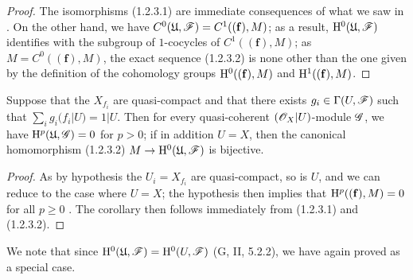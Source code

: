 \begin{proof}
\label{proof-3.1.2.3}
The isomorphisms (1.2.3.1) are immediate consequences of what we saw in .
On the other hand, we have $C^0(\mathfrak{U},\mathscr{F})=C^1((\mathbf{f}),M)$; as a result, $\mathrm{H}^0(\mathfrak{U},\mathscr{F})$ identifies with the subgroup of $1$-cocycles of $C^1((\mathbf{f}),M)$; as $M=C^0((\mathbf{f}),M)$, the exact sequence (1.2.3.2) is none other than the one given by the definition of the cohomology groups $\mathrm{H}^0((\mathbf{f}),M)$ and $\mathrm{H}^1((\mathbf{f}),M)$.
\end{proof}

\begin{cor}[1.2.4]
\label{3.1.2.4}
Suppose that the $X_{f_i}$ are quasi-compact and that there exists $g_i\in\Gamma(U,\mathscr{F})$ such that $\sum_i g_i(f_i|U)=1|U$.
Then for every quasi-coherent $(\mathscr{O}_X|U)$-module $\mathscr{G}$, we have $\mathrm{H}^p(\mathfrak{U},\mathscr{G})=0$ for $p>0$; if in addition $U=X$, then the canonical homomorphism (1.2.3.2) $M\to\HH^0(\fk{U},\sh{F})$ is bijective.
\end{cor}

\begin{proof}
\label{proof-3.1.2.4}
As by hypothesis the $U_i=X_{f_i}$ are quasi-compact, so is $U$, and we can reduce to the case where $U=X$; the hypothesis then implies that $\mathrm{H}^p((\mathbf{f}),M)=0$ for all $p\geq 0$ .
The corollary then follows immediately from (1.2.3.1) and (1.2.3.2).
\end{proof}

We note that since $\mathrm{H}^0(\mathfrak{U},\mathscr{F})=\mathrm{H}^0(U,\mathscr{F})$ (G, II, 5.2.2), we have again proved  as a special case.


